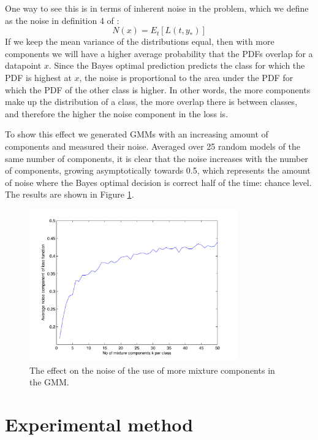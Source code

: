 \documentclass[a4paper]{article}
\begin{document}
One way to see this is in terms of inherent noise in the problem, which we define as the noise in definition 4 of \cite{Domingos2000}:
\begin{equation}
\label{eq:noise}
N(x) = E_t[L(t,y_*)]
\end{equation}
If we keep the mean variance of the distributions equal, then with more components we will have a higher average probability that the \ac{PDF}s overlap for a datapoint $x$. Since the Bayes optimal prediction predicts the class for which the \ac{PDF} is highest at $x$, the noise is proportional to the area under the \ac{PDF} for which the \ac{PDF} of the other class is higher. In other words, the more components make up the distribution of a class, the more overlap there is between classes, and therefore the higher the noise component in the loss is.

To show this effect we generated \ac{GMM}s with an increasing amount of components and measured their noise. Averaged over 25 random models of the same number of components, it is clear that the noise increases with the number of components, growing asymptotically towards 0.5, which represents the amount of noise where the Bayes optimal decision is correct half of the time: chance level. The results are shown in Figure \ref{fig:noisepercomp}.

\begin{figure}[htb]
    \centering
    \includegraphics[width=0.8\textwidth]{noise_per_k.pdf}
    \caption{The effect on the noise of the use of more mixture components in the \ac{GMM}. \label{fig:noisepercomp}}
\end{figure}

\section{Experimental method}
\label{sec:experimental_method}
\end{document}
